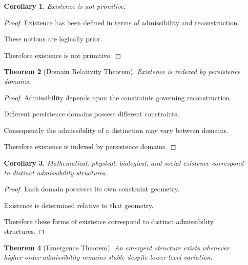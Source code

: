 \documentclass[12pt,oneside]{article}
\newtheorem{theorem}{Theorem}[section] \newtheorem{lemma}[theorem]{Lemma} \newtheorem{proposition}[theorem]{Proposition} \newtheorem{corollary}[theorem]{Corollary}
\theoremstyle{definition}
\begin{document}
\begin{corollary}

Existence is not primitive.

\end{corollary}

\begin{proof}

Existence has been defined in terms of admissibility and reconstruction.

These notions are logically prior.

Therefore existence is not primitive.

\end{proof}

\begin{theorem}[Domain Relativity Theorem]

Existence is indexed by persistence domains.

\end{theorem}

\begin{proof}

Admissibility depends upon the constraints governing reconstruction.

Different persistence domains possess different constraints.

Consequently the admissibility of a distinction may vary between domains.

Therefore existence is indexed by persistence domains.

\end{proof}

\begin{corollary}

Mathematical, physical, biological, and social existence correspond to distinct admissibility structures.

\end{corollary}

\begin{proof}

Each domain possesses its own constraint geometry.

Existence is determined relative to that geometry.

Therefore these forms of existence correspond to distinct admissibility structures.

\end{proof}

\begin{theorem}[Emergence Theorem]

An emergent structure exists whenever higher-order admissibility remains stable despite lower-level variation.

\end{theorem}
\end{document}
